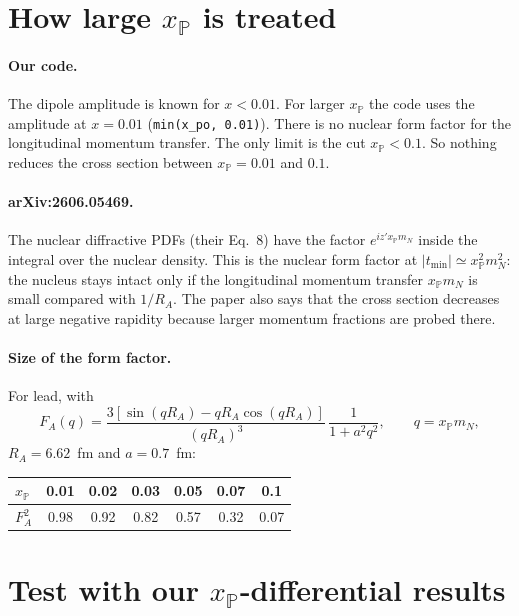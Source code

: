 \documentclass[11pt]{article}
\begin{document}
\section{How large $x_\mathbb{P}$ is treated}

\paragraph{Our code.} The dipole amplitude is known for $x<0.01$. For larger
$x_\mathbb{P}$ the code uses the amplitude at $x=0.01$
(\texttt{min(x\_po, 0.01)}). There is no nuclear form factor for the
longitudinal momentum transfer. The only limit is the cut
$x_\mathbb{P}<0.1$. So nothing reduces the cross section between
$x_\mathbb{P}=0.01$ and $0.1$.

\paragraph{arXiv:2606.05469.} The nuclear diffractive PDFs (their Eq.~8)
have the factor $e^{i z' x_\mathbb{P} m_N}$ inside the integral over the
nuclear density. This is the nuclear form factor at
$|t_{\min}|\simeq x_\mathbb{P}^2m_N^2$: the nucleus stays intact only if the
longitudinal momentum transfer $x_\mathbb{P}m_N$ is small compared with
$1/R_A$. The paper also says that the cross section decreases at large
negative rapidity because larger momentum fractions are probed there.

\paragraph{Size of the form factor.} For lead, with
\begin{equation}
  F_A(q)=\frac{3\left[\sin(qR_A)-qR_A\cos(qR_A)\right]}{(qR_A)^3}\,
  \frac{1}{1+a^2q^2}, \qquad q=x_\mathbb{P}m_N,
  \label{eq:FA}
\end{equation}
$R_A=6.62$~fm and $a=0.7$~fm:
\begin{center}
\begin{tabular}{lcccccc}
\toprule
$x_\mathbb{P}$ & 0.01 & 0.02 & 0.03 & 0.05 & 0.07 & 0.1 \\
\midrule
$F_A^2$ & 0.98 & 0.92 & 0.82 & 0.57 & 0.32 & 0.07 \\
\bottomrule
\end{tabular}
\end{center}

\section{Test with our $x_\mathbb{P}$-differential results}
\label{sec:test}
\end{document}
